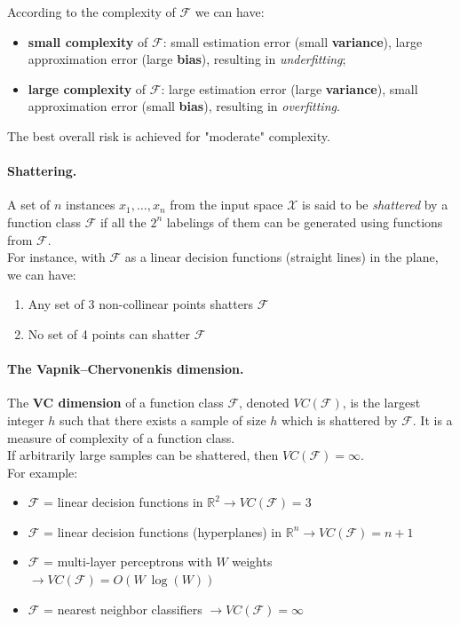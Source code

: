 
According to the complexity of $\mathcal{ F }$ we can have:
\begin{itemize}
	\item \textbf{small complexity} of $\mathcal{ F }$: small estimation error (small \textbf{variance}), large approximation error (large \textbf{bias}), resulting in \textit{underfitting};
	\item \textbf{large complexity} of $\mathcal{ F }$: large estimation error (large \textbf{variance}), small approximation error (small \textbf{bias}), resulting in \textit{overfitting}.
\end{itemize}

The best overall risk is achieved for "moderate" complexity.


\paragraph*{Shattering.} A set of $n$ instances $x_1, \dots, x_n$ from the input space $\mathcal{X}$ is said to be \textit{shattered} by a function class $\mathcal{ F }$ if all the $2^n$ labelings of them can be generated using functions from $\mathcal{ F }$.\\ 
For instance, with $\mathcal{ F }$ as a linear decision functions (straight lines) in the plane, we can have:
\begin{enumerate}[label=(\alph*)]
	\item Any set of 3 non-collinear points shatters $\mathcal{ F }$
	\item No set of 4 points can shatter $\mathcal{ F }$
\end{enumerate}

\paragraph*{The Vapnik–Chervonenkis dimension.} The \textbf{VC dimension} of a function class $\mathcal{ F }$, denoted $VC(\mathcal{ F })$, is the largest integer $h$ such that there exists a sample of size $h$ which is shattered by $\mathcal{ F }$. It is a measure of complexity of a function class.\\
If arbitrarily large samples can be shattered, then $VC(\mathcal{ F }) = \infty$.\\
For example:
\begin{itemize}
	\item $\mathcal{ F }$ = linear decision functions in $\mathbb{R}^2 \rightarrow VC(\mathcal{ F }) = 3$
	\item $\mathcal{ F }$ = linear decision functions (hyperplanes) in $\mathbb{R}^n \rightarrow VC(\mathcal{ F }) = n+1$ 
	\item $\mathcal{ F }$ = multi-layer perceptrons with $W$ weights $\rightarrow VC(\mathcal{ F }) = O(W~\log( W))$
	\item $\mathcal{ F }$ = nearest neighbor classifiers $\rightarrow VC(\mathcal{ F }) = \infty$
\end{itemize}



